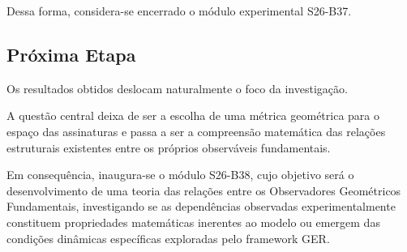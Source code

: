 \documentclass[11pt,a4paper]{article}
\begin{document}
Dessa forma, considera-se encerrado o módulo experimental S26-B37.

\subsection{Próxima Etapa}

Os resultados obtidos deslocam naturalmente o foco da investigação.

A questão central deixa de ser a escolha de uma métrica geométrica para o
espaço das assinaturas e passa a ser a compreensão matemática das relações
estruturais existentes entre os próprios observáveis fundamentais.

Em consequência, inaugura-se o módulo S26-B38, cujo objetivo será o
desenvolvimento de uma teoria das relações entre os Observadores
Geométricos Fundamentais, investigando se as dependências observadas
experimentalmente constituem propriedades matemáticas inerentes ao modelo
ou emergem das condições dinâmicas específicas exploradas pelo framework
GER.



\newpage

\end{document}
